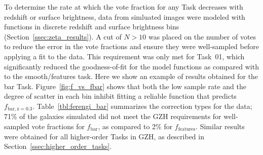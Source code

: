 \documentclass[twocolumn]{aastex6}
\begin{document}
To determine the rate at which the vote fraction for any Task decreases with redshift or surface brightness, data from simluated \ferengi{} images were modeled with functions in discrete redshift and surface brightness bins (Section~\ref{ssec:zeta_results}). A cut of $N>10$ was placed on the number of votes to reduce the error in the vote fractions and ensure they were well-sampled before applying a fit to the data. This requirement was only met for Task~01, which significantly reduced the goodness-of-fit for the model functions as compared with to the smooth/features task. Here we show an example of results obtained for the bar Task. Figure~\ref{fig:f_vs_fbar} shows that both the low sample rate and the degree of scatter in each bin inhibit fitting a reliable function that predicts $f_\mathrm{bar,z=0.3}$. Table~\ref{tbl:ferengi_bar} summarizes the correction types for the \ferengi{} data; 71\% of the galaxies simulated did not meet the GZH requirements for well-sampled vote fractions for $f_\mathrm{bar}$, as compared to 2\% for $f_\mathrm{features}$. Similar results were obtained for all higher-order Tasks in GZH, as described in Section~\ref{ssec:higher_order_tasks}.  
\end{document}
